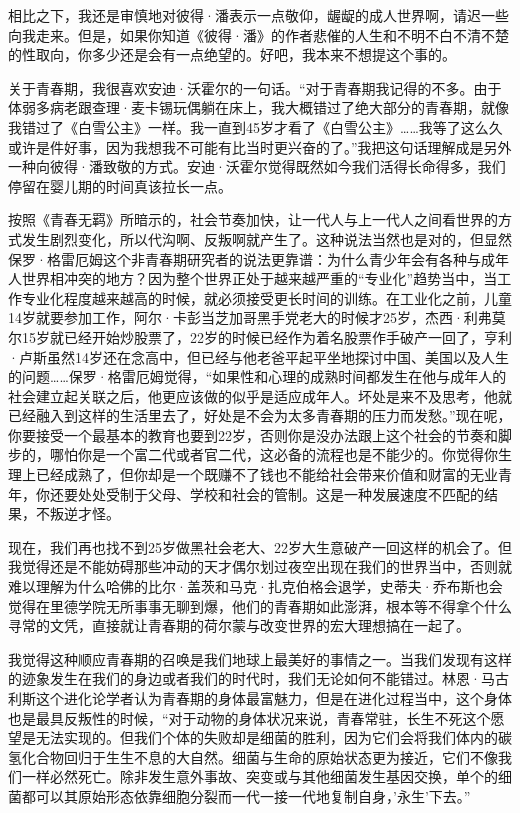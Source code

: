 相比之下，我还是审慎地对彼得·潘表示一点敬仰，龌龊的成人世界啊，请迟一些向我走来。但是，如果你知道《彼得·潘》的作者悲催的人生和不明不白不清不楚的性取向，你多少还是会有一点绝望的。好吧，我本来不想提这个事的。

关于青春期，我很喜欢安迪·沃霍尔的一句话。``对于青春期我记得的不多。由于体弱多病老跟查理·麦卡锡玩偶躺在床上，我大概错过了绝大部分的青春期，就像我错过了《白雪公主》一样。我一直到45岁才看了《白雪公主》\ldots\ldots 我等了这么久或许是件好事，因为我想我不可能有比当时更兴奋的了。''我把这句话理解成是另外一种向彼得·潘致敬的方式。安迪·沃霍尔觉得既然如今我们活得长命得多，我们停留在婴儿期的时间真该拉长一点。

按照《青春无羁》所暗示的，社会节奏加快，让一代人与上一代人之间看世界的方式发生剧烈变化，所以代沟啊、反叛啊就产生了。这种说法当然也是对的，但显然保罗·格雷厄姆这个非青春期研究者的说法更靠谱：为什么青少年会有各种与成年人世界相冲突的地方？因为整个世界正处于越来越严重的``专业化''趋势当中，当工作专业化程度越来越高的时候，就必须接受更长时间的训练。在工业化之前，儿童14岁就要参加工作，阿尔·卡彭当芝加哥黑手党老大的时候才25岁，杰西·利弗莫尔15岁就已经开始炒股票了，22岁的时候已经作为着名股票作手破产一回了，亨利·卢斯虽然14岁还在念高中，但已经与他老爸平起平坐地探讨中国、美国以及人生的问题\ldots\ldots 保罗·格雷厄姆觉得，``如果性和心理的成熟时间都发生在他与成年人的社会建立起关联之后，他更应该做的似乎是适应成年人。坏处是来不及思考，他就已经融入到这样的生活里去了，好处是不会为太多青春期的压力而发愁。''现在呢，你要接受一个最基本的教育也要到22岁，否则你是没办法跟上这个社会的节奏和脚步的，哪怕你是一个富二代或者官二代，这必备的流程也是不能少的。你觉得你生理上已经成熟了，但你却是一个既赚不了钱也不能给社会带来价值和财富的无业青年，你还要处处受制于父母、学校和社会的管制。这是一种发展速度不匹配的结果，不叛逆才怪。

现在，我们再也找不到25岁做黑社会老大、22岁大生意破产一回这样的机会了。但我觉得还是不能妨碍那些冲动的天才偶尔划过夜空出现在我们的世界当中，否则就难以理解为什么哈佛的比尔·盖茨和马克·扎克伯格会退学，史蒂夫·乔布斯也会觉得在里德学院无所事事无聊到爆，他们的青春期如此澎湃，根本等不得拿个什么寻常的文凭，直接就让青春期的荷尔蒙与改变世界的宏大理想搞在一起了。

我觉得这种顺应青春期的召唤是我们地球上最美好的事情之一。当我们发现有这样的迹象发生在我们的身边或者我们的时代时，我们无论如何不能错过。林恩·马古利斯这个进化论学者认为青春期的身体最富魅力，但是在进化过程当中，这个身体也是最具反叛性的时候，``对于动物的身体状况来说，青春常驻，长生不死这个愿望是无法实现的。但我们个体的失败却是细菌的胜利，因为它们会将我们体内的碳氢化合物回归于生生不息的大自然。细菌与生命的原始状态更为接近，它们不像我们一样必然死亡。除非发生意外事故、突变或与其他细菌发生基因交换，单个的细菌都可以其原始形态依靠细胞分裂而一代一接一代地复制自身，'永生'下去。''

